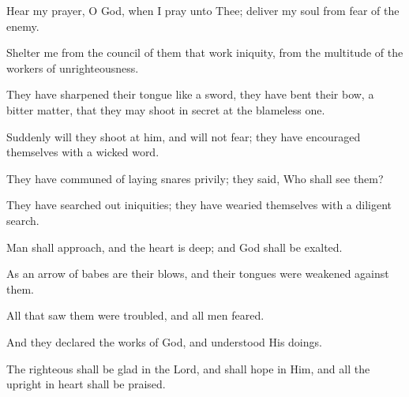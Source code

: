 Hear my prayer, O God, when I pray unto Thee; deliver my soul from fear of the enemy.

Shelter me from the council of them that work iniquity, from the multitude of the workers of unrighteousness.

They have sharpened their tongue like a sword, they have bent their bow, a bitter matter, that they may shoot in secret at the blameless one.

Suddenly will they shoot at him, and will not fear; they have encouraged themselves with a wicked word.

They have communed of laying snares privily; they said, Who shall see them?

They have searched out iniquities; they have wearied themselves with a diligent search.

Man shall approach, and the heart is deep; and God shall be exalted.

As an arrow of babes are their blows, and their tongues were weakened against them.

All that saw them were troubled, and all men feared.

And they declared the works of God, and understood His doings.

The righteous shall be glad in the Lord, and shall hope in Him, and all the upright in heart shall be praised.
